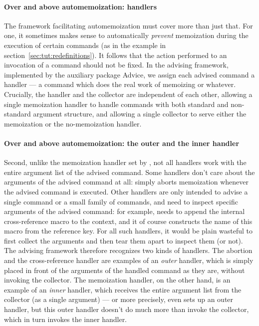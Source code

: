 \documentclass[a4paper,11pt]{article}
\begin{document}
\paragraph{Over and above automemoization: handlers}
The framework facilitating automemoization must cover more than just that.  For
one, it sometimes makes sense to automatically \emph{prevent} memoization
during the execution of certain commands (as in the 
example in section~\ref{sec:tut:redefinitions}).  It follows that the action
performed to an invocation of a command should not be fixed.  In the advising
framework, implemented by the auxiliary package Advice, we assign each
advised command a handler --- a command which does the real work of
memoizing or whatever.  Crucially, the handler and the collector are
independent of each other, allowing a single memoization handler to handle
commands with both standard and non-standard argument structure, and allowing a
single collector to serve either the memoization or the no-memoization handler.

\paragraph{Over and above automemoization: the outer and the inner handler}
Second, unlike the memoization handler set by , not all
handlers work with the entire argument list of the advised command.  Some
handlers don't care about the arguments of the advised command at all:
 simply aborts memoization whenever the advised command is
executed.  Other handlers are only intended to advise a single command or a
small family of commands, and need to inspect specific arguments of the advised
command: for example,  needs to append the internal
cross-reference macro to the context, and it of course constructs the name of
this macro from the reference key.  For all such handlers, it would be plain
wasteful to first collect the arguments and then tear them apart to inspect
them (or not).  The advising framework therefore recognizes two kinds of
handlers.  The abortion and the cross-reference handler are examples of an
\emph{outer} handler, which is simply placed in front of the arguments of the
handled command as they are, without invoking the collector.  The memoization
handler, on the other hand, is an example of an \emph{inner} handler, which
receives the entire argument list from the collector (as a single argument) ---
or more precisely, even  sets up an outer handler, but this
outer handler doesn't do much more than invoke the collector, which in turn
invokes the inner handler.
\end{document}
